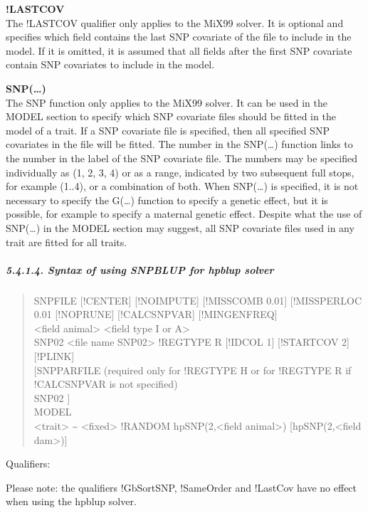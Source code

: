 \textbf{!LASTCOV}\\
The !LASTCOV qualifier only applies to the MiX99 solver. It is optional
and specifies which field contains the last SNP covariate of the file to
include in the model. If it is omitted, it is assumed that all fields
after the first SNP covariate contain SNP covariates to include in the
model.

\textbf{SNP(\ldots)}\\
The SNP function only applies to the MiX99 solver. It can be used in the
MODEL section to specify which SNP covariate files should be fitted in
the model of a trait. If a SNP covariate file is specified, then all
specified SNP covariates in the file will be fitted. The number in the
SNP(\ldots) function links to the number in the label of the SNP
covariate file. The numbers may be specified individually as (1, 2, 3,
4) or as a range, indicated by two subsequent full stops, for example
(1..4), or a combination of both. When SNP(\ldots) is specified, it is
not necessary to specify the G(\ldots) function to specify a genetic
effect, but it is possible, for example to specify a maternal genetic
effect. Despite what the use of SNP(\ldots) in the MODEL section may
suggest, all SNP covariate files used in any trait are fitted for all
traits.

\subparagraph{5.4.1.4. Syntax of using SNPBLUP for hpblup
solver}\label{Gene34}

\begin{quote}
SNPFILE {[}!CENTER{]} {[}!NOIMPUTE{]} {[}!MISSCOMB 0.01{]}
{[}!MISSPERLOC 0.01 {[}!NOPRUNE{]} {[}!CALCSNPVAR{]} {[}!MINGENFREQ{]}\\
\textless field animal\textgreater{} \textless field type I or
A\textgreater{}\\
SNP02 \textless file name SNP02\textgreater{} !REGTYPE R {[}!IDCOL 1{]}
{[}!STARTCOV 2{]} {[}!PLINK{]}\\
{[}SNPPARFILE (required only for !REGTYPE H or for !REGTYPE R if
!CALCSNPVAR is not specified)\\
SNP02 {]}\\
MODEL\\
\textless trait\textgreater{} \textasciitilde{}
\textless fixed\textgreater{} !RANDOM hpSNP(2,\textless field
animal\textgreater) {[}hpSNP(2,\textless field dam\textgreater){]}
\end{quote}

Qualifiers:

Please note: the qualifiers !GbSortSNP, !SameOrder and !LastCov have no
effect when using the hpblup solver.

